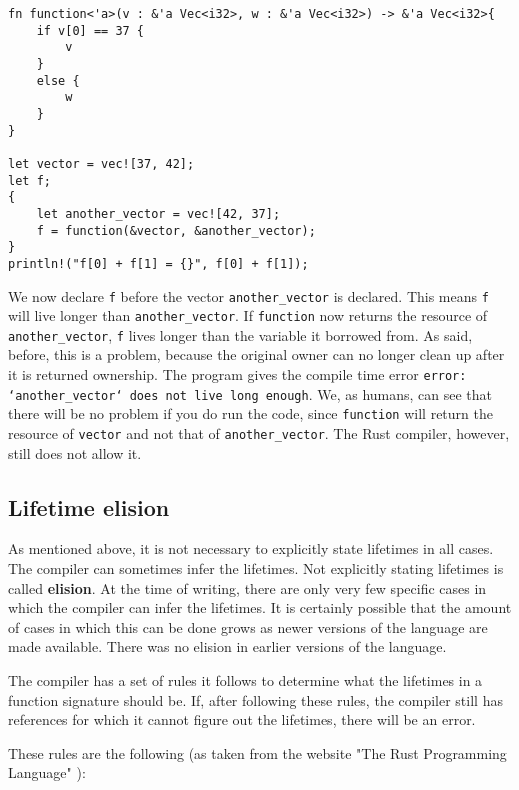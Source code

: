 \begin{verbatim}
fn function<'a>(v : &'a Vec<i32>, w : &'a Vec<i32>) -> &'a Vec<i32>{
    if v[0] == 37 {
        v
    }
    else {
        w
    }
}

let vector = vec![37, 42];
let f;
{
    let another_vector = vec![42, 37];
    f = function(&vector, &another_vector);
}
println!("f[0] + f[1] = {}", f[0] + f[1]);
\end{verbatim}

We now declare \verb|f| before the vector \verb|another_vector| is declared. This means \verb|f| will live longer than \verb|another_vector|. If \verb|function| now returns the resource of \verb|another_vector|, \verb|f| lives longer than the variable it borrowed from. As said, before, this is a problem, because the original owner can no longer clean up after it is returned ownership. The program gives the compile time error \texttt{error: `another\_vector` does not live long enough}. We, as humans, can see that there will be no problem if you do run the code, since \verb|function| will return the resource of \verb|vector| and not that of \verb|another_vector|. The Rust compiler, however, still does not allow it. 

\subsection{Lifetime elision}
As mentioned above, it is not necessary to explicitly state lifetimes in all cases. The compiler can sometimes infer the lifetimes. Not explicitly stating lifetimes is called \textbf{elision}. At the time of writing, there are only very few specific cases in which the compiler can infer the lifetimes. It is certainly possible that the amount of cases in which this can be done grows as newer versions of the language are made available. There was no elision in earlier versions of the language. 

The compiler has a set of rules it follows to determine what the lifetimes in a function signature should be. If, after following these rules, the compiler still has references for which it cannot figure out the lifetimes, there will be an error. 

These rules are the following (as taken from the website "The Rust Programming Language" \citep{lifetimes}):

